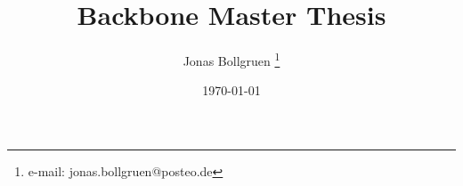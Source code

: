 \documentclass[a4paper,cleardoubleempty,BCOR1cm]{scrbook}
\title{Backbone Master Thesis}
\author{Jonas Bollgruen \thanks{e-mail: jonas.bollgruen@posteo.de}}
\date{\today}
\begin{document}



\appendix

%
%
\nocite{*}

\end{document}
